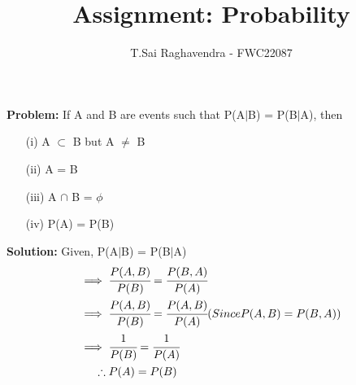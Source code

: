 \documentclass{article}
\newcommand{\Problem}{\noindent \textbf{Problem: }}
\newcommand{\solution}{\noindent \textbf{Solution: }}
\begin{document}
\title{Assignment: Probability}
\author{\Large T.Sai Raghavendra - FWC22087}
\date{}


\maketitle

\Problem If A and B are events such that P(A$|$B) = P(B$|$A), then\\
\begin{enumerate}
\item[(i)] A $\subset$ B but A $\not=$ B
\item[(ii)] A = B
\item[(iii)] A $\cap$ B = $\phi$
\item[(iv)] P(A) = P(B)
\end{enumerate}

\solution
Given, P(A$|$B) = P(B$|$A)
\begin{align*}
\implies& \; \cfrac{P(A,B)}{P(B)} = \cfrac{P(B,A)}{P(A)}\\ 
\implies& \; \cfrac{P(A,B)}{P(B)} = \cfrac{P(A,B)}{P(A)} (Since P(A,B) = P(B,A))\\
\implies& \; \cfrac{1}{P(B)} = \cfrac{1}{P(A)}\\
\therefore& \; P(A) = P(B)
\end{align*}
\end{document}
